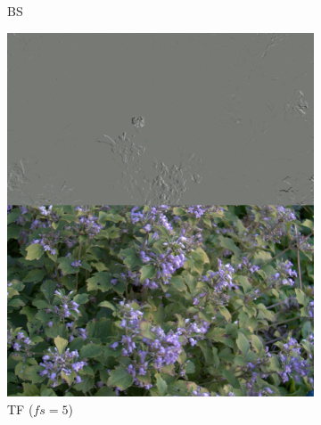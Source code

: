 \documentclass[sigchi,screen]{acmart}
\begin{document}
\begin{figure}[htp]
\begin{subfigure}{0.25\linewidth}
    \caption{BS}
  \end{subfigure}%
  \begin{subfigure}{0.25\linewidth}
    \centering
    \includegraphics[width=\linewidth]{figures/preprocessings/temporal_filtering.jpg}
    \caption{TF ($fs = 5$)}
  \end{subfigure}%
  \begin{subfigure}{0.25\linewidth}
    \centering

\end{subfigure}
\end{figure}
\end{document}
